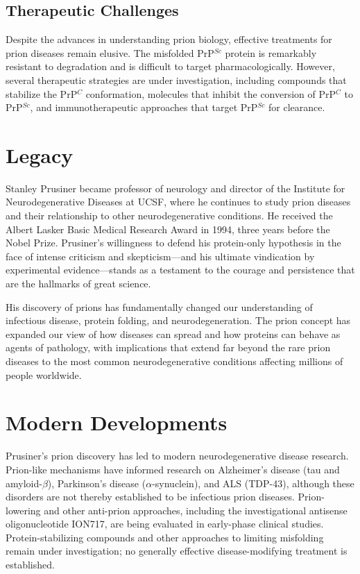 \subsection{Therapeutic Challenges}

Despite the advances in understanding prion biology, effective treatments for prion diseases remain elusive. The misfolded PrP$^{Sc}$ protein is remarkably resistant to degradation and is difficult to target pharmacologically. However, several therapeutic strategies are under investigation, including compounds that stabilize the PrP$^{C}$ conformation, molecules that inhibit the conversion of PrP$^{C}$ to PrP$^{Sc}$, and immunotherapeutic approaches that target PrP$^{Sc}$ for clearance.

\section{Legacy}

Stanley Prusiner became professor of neurology and director of the Institute for Neurodegenerative Diseases at UCSF, where he continues to study prion diseases and their relationship to other neurodegenerative conditions. He received the Albert Lasker Basic Medical Research Award in 1994, three years before the Nobel Prize. Prusiner's willingness to defend his protein-only hypothesis in the face of intense criticism and skepticism---and his ultimate vindication by experimental evidence---stands as a testament to the courage and persistence that are the hallmarks of great science.

His discovery of prions has fundamentally changed our understanding of infectious disease, protein folding, and neurodegeneration. The prion concept has expanded our view of how diseases can spread and how proteins can behave as agents of pathology, with implications that extend far beyond the rare prion diseases to the most common neurodegenerative conditions affecting millions of people worldwide.


\section{Modern Developments}

Prusiner's prion discovery has led to modern neurodegenerative disease research. Prion-like mechanisms have informed research on Alzheimer's disease (tau and amyloid-$\beta$), Parkinson's disease ($\alpha$-synuclein), and ALS (TDP-43), although these disorders are not thereby established to be infectious prion diseases. Prion-lowering and other anti-prion approaches, including the investigational antisense oligonucleotide ION717, are being evaluated in early-phase clinical studies. Protein-stabilizing compounds and other approaches to limiting misfolding remain under investigation; no generally effective disease-modifying treatment is established.


